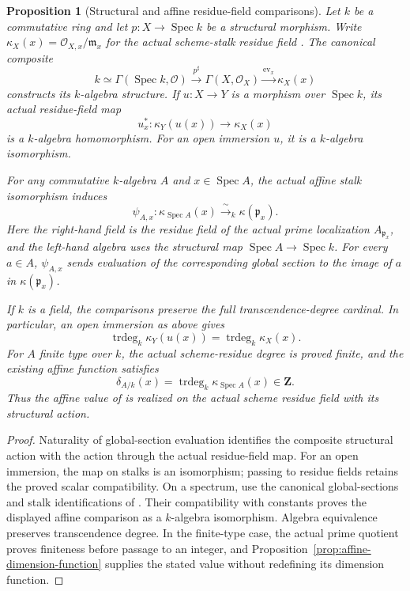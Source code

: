 \documentclass[11pt]{article}
\newtheorem{proposition}[theorem]{Proposition}
\theoremstyle{definition}
\theoremstyle{remark}
\DeclareMathOperator{\Spec}{Spec}
\begin{document}
\begin{proposition}[Structural and affine residue-field comparisons]
\label{prop:structural-residue-field}
Let \(k\) be a commutative ring and let \(p:X\to\Spec k\) be a
structural morphism. Write
\(\kappa_X(x)=\mathcal O_{X,x}/\mathfrak m_x\) for the actual
scheme-stalk residue field \cite{StacksSchemeResidueField}.
The canonical composite
\[
  k\simeq\Gamma(\Spec k,\mathcal O)
    \xrightarrow{p^\sharp}\Gamma(X,\mathcal O_X)
    \xrightarrow{\operatorname{ev}_x}\kappa_X(x)
\]
constructs its \(k\)-algebra structure. If \(u:X\to Y\) is a
morphism over \(\Spec k\), its actual residue-field map
\[
  u_x^*:\kappa_Y(u(x))\longrightarrow\kappa_X(x)
\]
is a \(k\)-algebra homomorphism. For an open immersion \(u\), it is
a \(k\)-algebra isomorphism.

For any commutative \(k\)-algebra \(A\) and \(x\in\Spec A\), the
actual affine stalk isomorphism induces
\[
  \psi_{A,x}:\kappa_{\Spec A}(x)
      \xrightarrow{\ \sim\ }_k\kappa(\mathfrak p_x).
\]
Here the right-hand field is the residue field of the actual prime
localization \(A_{\mathfrak p_x}\), and the left-hand algebra uses
the structural map \(\Spec A\to\Spec k\). For every \(a\in A\),
\(\psi_{A,x}\) sends evaluation of the corresponding global section
to the image of \(a\) in \(\kappa(\mathfrak p_x)\).

If \(k\) is a field, the comparisons preserve the full
transcendence-degree cardinal. In particular, an open immersion as
above gives
\[
  \operatorname{trdeg}_k\kappa_Y(u(x))
    =\operatorname{trdeg}_k\kappa_X(x).
\]
For \(A\) finite type over \(k\), the actual scheme-residue degree
is proved finite, and the existing affine function satisfies
\[
  \delta_{A/k}(x)
    =\operatorname{trdeg}_k\kappa_{\Spec A}(x)\in\mathbf Z.
\]
Thus the affine value of \cite{StacksAlgebraicSchemeDimension} is
realized on the actual scheme residue field with its structural action.
\end{proposition}

\begin{proof}
Naturality of global-section evaluation identifies the composite
structural action with the action through the actual residue-field map.
For an open immersion, the map on stalks is an isomorphism; passing to
residue fields retains the proved scalar compatibility.
On a spectrum, use the canonical global-sections and stalk
identifications of \cite{StacksAffineStalk}. Their compatibility with
constants proves the displayed affine comparison as a \(k\)-algebra
isomorphism.
Algebra equivalence preserves transcendence degree. In the finite-type
case, the actual prime quotient proves finiteness before passage to an
integer, and Proposition~\ref{prop:affine-dimension-function} supplies
the stated value without redefining its dimension function.
\end{proof}
\end{document}
